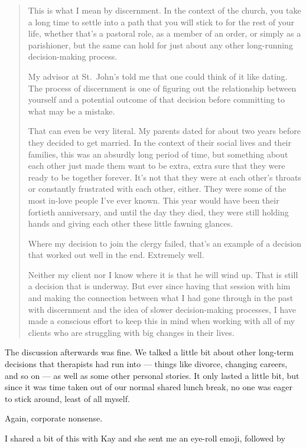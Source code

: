 \begin{quote}
This is what I mean by discernment. In the context of the church, you take a long time to settle into a path that you will stick to for the rest of your life, whether that's a pastoral role, as a member of an order, or simply as a parishioner, but the same can hold for just about any other long-running decision-making process.

My advisor at St.~John's told me that one could think of it like dating. The process of discernment is one of figuring out the relationship between yourself and a potential outcome of that decision before committing to what may be a mistake.

That can even be very literal. My parents dated for about two years before they decided to get married. In the context of their social lives and their families, this was an absurdly long period of time, but something about each other just made them want to be extra, extra sure that they were ready to be together forever. It's not that they were at each other's throats or constantly frustrated with each other, either. They were some of the most in-love people I've ever known. This year would have been their fortieth anniversary, and until the day they died, they were still holding hands and giving each other these little fawning glances.

Where my decision to join the clergy failed, that's an example of a decision that worked out well in the end. Extremely well.

Neither my client nor I know where it is that he will wind up. That is still a decision that is underway. But ever since having that session with him and making the connection between what I had gone through in the past with discernment and the idea of slower decision-making processes, I have made a conscious effort to keep this in mind when working with all of my clients who are struggling with big changes in their lives.
\end{quote}

The discussion afterwards was fine. We talked a little bit about other long-term decisions that therapists had run into --- things like divorce, changing careers, and so on --- as well as some other personal stories. It only lasted a little bit, but since it was time taken out of our normal shared lunch break, no one was eager to stick around, least of all myself.

Again, corporate nonsense.

I shared a bit of this with Kay and she sent me an eye-roll emoji, followed by

